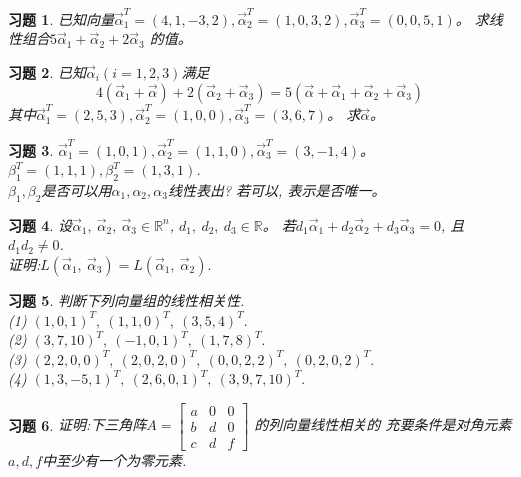 \documentclass[a4paper]{book}
\newtheorem{ex}{习题}[chapter]
\begin{document}
\begin{ex}\label{4.2}
已知向量$\vec{\alpha}_1^T=(4,1,-3,2), \vec{\alpha}_2^T=(1,0,3,2), \vec{\alpha}_3^T=(0,0,5,1)$。
求线性组合$5\vec{\alpha}_1+\vec{\alpha}_2+2\vec{\alpha}_3$ 的值。
\end{ex}

\begin{ex}\label{4.3}
已知$\vec{\alpha}_i(i=1, 2, 3)$满足
$$4(\vec{\alpha}_1+\vec{\alpha})+2(\vec{\alpha}_2+\vec{\alpha}_3)=5(\vec{\alpha}+\vec{\alpha}_1+\vec{\alpha}_2+\vec{\alpha}_3)$$
其中$\vec{\alpha}_1^T=(2,5,3), \vec{\alpha}_2^T=(1,0,0), \vec{\alpha}_3^T=(3,6,7)$。 求$\vec{\alpha}$。
\end{ex}

\begin{ex}\label{4.4}
$\vec{\alpha}_1^T=(1,0,1), \vec{\alpha}_2^T=(1,1,0), \vec{\alpha}_3^T=(3,-1,4)$。$\beta_1^T=(1,1,1), \beta_2^T=(1,3,1)$.\\
$\beta_1,\beta_2$是否可以用$\alpha_1,\alpha_2,\alpha_3$线性表出? 若可以, 表示是否唯一。
\end{ex}

\begin{ex}\label{4.5}
设$\vec{\alpha}_1,\ \vec{\alpha}_2,\ \vec{\alpha}_3\in \mathbb{R}^n$, $d_1,\ d_2,\ d_3 \in \mathbb{R}$。
若$d_1\vec{\alpha}_1+d_2\vec{\alpha}_2+d_3\vec{\alpha}_3=0$, 且$d_1d_2\not=0$.\\
证明:$L(\vec{\alpha}_1,\ \vec{\alpha}_3)=L(\vec{\alpha}_1,\ \vec{\alpha}_2).$
\end{ex}

\begin{ex}\label{4.6}
判断下列向量组的线性相关性.\\
(1) $(1,0,1)^T,\ (1,1,0)^T,\ (3,5,4)^T.$\\
(2) $(3,7,10)^T,\ (-1,0,1)^T,\ (1,7,8)^T.$\\
(3) $(2,2,0,0)^T,\  (2,0,2,0)^T,\ (0,0,2,2)^T,\ (0,2,0,2)^T.$\\
(4) $(1,3,-5,1)^T,\ (2,6,0,1)^T,\ (3,9,7,10)^T.$
\end{ex}

\begin{ex}\label{4.7}
证明:下三角阵$A=\begin{bmatrix} a&0&0\\b&d&0\\c&d&f\end{bmatrix}$ 的列向量线性相关的
充要条件是对角元素$a,d,f$中至少有一个为零元素.
\end{ex}
\end{document}
